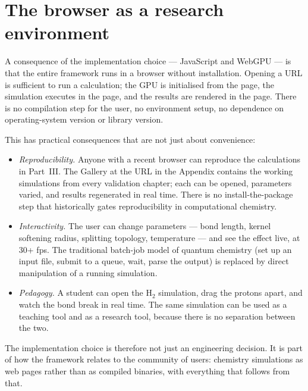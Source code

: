 \section{The browser as a research environment}\label{sec:browser}

A consequence of the implementation choice --- JavaScript and WebGPU --- is that the entire framework runs in a browser without installation. Opening a URL is sufficient to run a calculation; the GPU is initialised from the page, the simulation executes in the page, and the results are rendered in the page. There is no compilation step for the user, no environment setup, no dependence on operating-system version or library version.

This has practical consequences that are not just about convenience:

\begin{itemize}
\item \emph{Reproducibility.} Anyone with a recent browser can reproduce the calculations in Part~III. The Gallery at the URL in the Appendix contains the working simulations from every validation chapter; each can be opened, parameters varied, and results regenerated in real time. There is no install-the-package step that historically gates reproducibility in computational chemistry.
\item \emph{Interactivity.} The user can change parameters --- bond length, kernel softening radius, splitting topology, temperature --- and see the effect live, at 30+ fps. The traditional batch-job model of quantum chemistry (set up an input file, submit to a queue, wait, parse the output) is replaced by direct manipulation of a running simulation.
\item \emph{Pedagogy.} A student can open the H$_2$ simulation, drag the protons apart, and watch the bond break in real time. The same simulation can be used as a teaching tool and as a research tool, because there is no separation between the two.
\end{itemize}

The implementation choice is therefore not just an engineering decision. It is part of how the framework relates to the community of users: chemistry simulations as web pages rather than as compiled binaries, with everything that follows from that.

